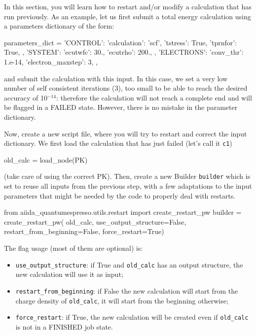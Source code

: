 In this section, you will learn how to restart and/or modify a calculation that has run previously. As an example, let us first submit a total energy calculation using a parameters dictionary of the form:
\begin{pythoncommand}
parameters_dict = {
    'CONTROL': {
        'calculation': 'scf',
        'tstress': True,
        'tprnfor': True,
    },
    'SYSTEM': {
        'ecutwfc': 30.,
        'ecutrho': 200.,
    },
    'ELECTRONS': {
        'conv_thr': 1.e-14,
        'electron_maxstep': 3,
    },
}
\end{pythoncommand}
and submit the calculation with this input.
In this case, we set a very low number of self consistent iterations (3), too small to be able to reach the desired accuracy of 10$^{-14}$: therefore the calculation will not reach a complete end and will be flagged in a FAILED state. However, there is no mistake in the parameter dictionary.

Now, create a new script file, where you will try to restart and correct the input dictionary.
We first load the calculation that has just failed (let's call it \texttt{c1})
\begin{pythoncommand}
old_calc = load_node(PK)
\end{pythoncommand}
(take care of using the correct PK).
Then, create a new Builder \texttt{builder} which is set to reuse all inputs
from the previous step, with a few adaptations to the input parameters
that might be needed by the code to properly deal with restarts. 
\begin{pythoncommand}
from aiida_quantumespresso.utils.restart import create_restart_pw
builder = create_restart_pw(                                     
   old_calc,                            
   use_output_structure=False,  
   restart_from_beginning=False, 
   force_restart=True)
\end{pythoncommand}
The flag usage (most of them are optional) is:
\begin{itemize}
 \item \texttt{use\_output\_structure}: if True and \texttt{old\_calc} has an output structure, the new calculation will use it as input; 
 \item \texttt{restart\_from\_beginning}: if False the new calculation will start from the charge density of \texttt{old\_calc}, it will start from the beginning otherwise;
 \item \texttt{force\_restart}: if True, the new calculation will be created even 
 if \texttt{old\_calc} is not in a FINISHED job state.
\end{itemize}

